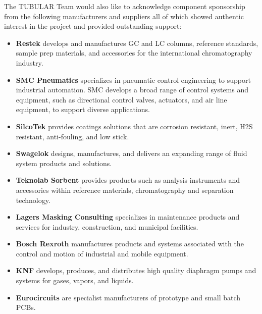 The TUBULAR Team would also like to acknowledge component sponsorship from the following manufacturers and suppliers all of which showed authentic interest in the project and provided outstanding support:

\begin{itemize}
  \item \textbf{Restek} develops and manufactures GC and LC columns, reference standards, sample prep materials, and accessories for the international chromatography industry. 
  \item \textbf{SMC Pneumatics} specializes in pneumatic control engineering to support industrial automation. SMC develops a broad range of control systems and equipment, such as directional control valves, actuators, and air line equipment, to support diverse applications.
  \item \textbf{SilcoTek} provides coatings solutions that are corrosion resistant, inert, H2S resistant, anti-fouling, and low stick.
  \item \textbf{Swagelok} designs, manufactures, and delivers an expanding range of fluid system products and solutions.
  \item \textbf{Teknolab Sorbent} provides products such as  analysis instruments and accessories within reference materials, chromatography and separation technology.
  \item \textbf{Lagers Masking Consulting} specializes in maintenance products and services for industry, construction, and municipal facilities.
  \item \textbf{Bosch Rexroth} manufactures products and systems associated with the control and motion of industrial and mobile equipment.
  \item \textbf{KNF} develops, produces, and distributes high quality diaphragm pumps and systems for gases, vapors, and liquids.
  \item \textbf{Eurocircuits} are specialist manufacturers of prototype and small batch PCBs.
\end{itemize}